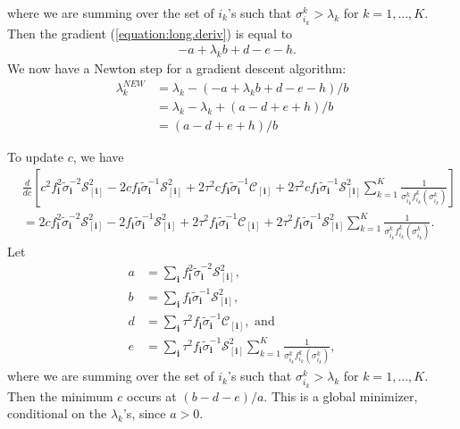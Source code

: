 where we are summing over the set of $i_{k}$'s such that
$\sigma_{i_k}^k > \lambda_k$ for $k = 1,\ldots,K$. Then the gradient
(\ref{equation:long.deriv}) is equal to
\begin{align*}
  &-a + \lambda_k b + d - e - h.
\end{align*}
We now have a Newton step for a gradient descent algorithm:
\begin{align*}
  \lambda_k^{NEW} &= \lambda_k - (-a + \lambda_k b + d - e - h) / b\\
  &= \lambda_k  - \lambda_k  + (a - d + e + h) / b\\
  &= (a - d + e + h) / b
\end{align*}

To update $c$, we have
\begin{align*}
  &\frac{d}{dc}\left[c^2f_{\mathbf{i}}^2\tilde{\sigma}^{-2}_{\mathbf{i}}\mathcal{S}_{[\mathbf{i}]}^2 - 2 cf_{\mathbf{i}}\tilde{\sigma}^{-1}_{\mathbf{i}}\mathcal{S}_{[\mathbf{i}]}^2 + 2\tau^2cf_{\mathbf{i}}\tilde{\sigma}^{-1}_{\mathbf{i}}\mathcal{C}_{[\mathbf{i}]} + 2\tau^2cf_{\mathbf{i}}\tilde{\sigma}^{-1}_{\mathbf{i}}\mathcal{S}_{[\mathbf{i}]}^2 \sum_{k=1}^K\frac{1}{\sigma_{i_k}^kf_{i_k}^k(\sigma_{i_k}^k)}\right]\\
  &=2cf_{\mathbf{i}}^2\tilde{\sigma}^{-2}_{\mathbf{i}}\mathcal{S}_{[\mathbf{i}]}^2 - 2f_{\mathbf{i}}\tilde{\sigma}^{-1}_{\mathbf{i}}\mathcal{S}_{[\mathbf{i}]}^2 + 2\tau^2f_{\mathbf{i}}\tilde{\sigma}^{-1}_{\mathbf{i}}\mathcal{C}_{[\mathbf{i}]} + 2\tau^2f_{\mathbf{i}}\tilde{\sigma}^{-1}_{\mathbf{i}}\mathcal{S}_{[\mathbf{i}]}^2 \sum_{k=1}^K\frac{1}{\sigma_{i_k}^kf_{i_k}^k(\sigma_{i_k}^k)}.
\end{align*}
Let
\begin{align*}
  a &= \sum_{\mathbf{i}}f_{\mathbf{i}}^2\tilde{\sigma}^{-2}_{\mathbf{i}}\mathcal{S}_{[\mathbf{i}]}^2,\\
  b &= \sum_{\mathbf{i}}f_{\mathbf{i}}\tilde{\sigma}^{-1}_{\mathbf{i}}\mathcal{S}_{[\mathbf{i}]}^2,\\
  d &= \sum_{\mathbf{i}}\tau^2f_{\mathbf{i}}\tilde{\sigma}^{-1}_{\mathbf{i}}\mathcal{C}_{[\mathbf{i}]}, \text{ and}\\
  e &= \sum_{\mathbf{i}}\tau^2f_{\mathbf{i}}\tilde{\sigma}^{-1}_{\mathbf{i}}\mathcal{S}_{[\mathbf{i}]}^2 \sum_{k=1}^K\frac{1}{\sigma_{i_k}^kf_{i_k}^k(\sigma_{i_k}^k)},
\end{align*}
where we are summing over the set of $i_k$'s such that $\sigma_{i_k}^k
> \lambda_k$ for $k = 1,\ldots,K$. Then the minimum $c$ occurs at $(b
- d - e)/a$. This is a global minimizer, conditional on the
$\lambda_k$'s, since $a > 0$.


